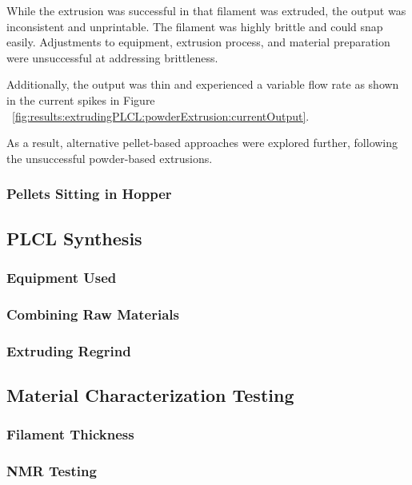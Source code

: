 While the extrusion was successful in that filament was extruded, the output was inconsistent and unprintable. The filament was highly brittle and could snap easily. Adjustments to equipment, extrusion process, and material preparation were unsuccessful at addressing brittleness.

Additionally, the output was thin and experienced a variable flow rate as shown in the current spikes in Figure ~\ref{fig:results:extrudingPLCL:powderExtrusion:currentOutput}.

As a result, alternative pellet-based approaches were explored further, following the unsuccessful powder-based extrusions.

\subsubsection{Pellets Sitting in Hopper}

\subsection{PLCL Synthesis}
\label{sec:methodology:plclSynthesis}

\subsubsection{Equipment Used}

\subsubsection{Combining Raw Materials}

\subsubsection{Extruding Regrind}

\subsection{Material Characterization Testing}
\label{sec:methodology:materialCharacterization}

\subsubsection{Filament Thickness}

\subsubsection{NMR Testing}